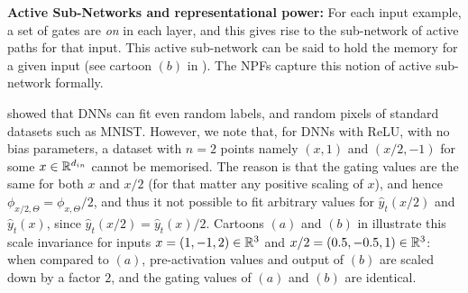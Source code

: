\textbf{Active Sub-Networks and representational power:} For each input example, a set of gates are \emph{on} in each layer, and this gives rise to the sub-network of active paths for that input. This active sub-network can be said to hold the memory for a given input (see cartoon $(b)$ in ). The NPFs capture this notion of active sub-network formally.

\cite{ben} showed that DNNs can fit even random labels, and random pixels of standard datasets such as MNIST. However, we note that, for DNNs with ReLU, with no bias parameters, a dataset with $n=2$ points namely $(x,1)$ and $(x/2,-1)$ for some $x\in \mathbb{R}^{d_{in}}$ cannot be memorised. The reason is that the gating values are the same for both $x$ and $x/2$ (for that matter any positive scaling of $x$), and hence $\phi_{x/2,\Theta}= \phi_{x,\Theta}/2$, and thus it not possible to fit arbitrary values for $\hat{y}_t(x/2)$ and $\hat{y}_t(x)$, since $\hat{y}_t(x/2)= \hat{y}_t(x)/2$. Cartoons $(a)$ and $(b)$ in  illustrate this scale invariance for inputs $x=(1,-1,2)\in\mathbb{R}^3$ and $x/2=(0.5,-0.5,1)\in\mathbb{R}^3$:  when compared to $(a)$, pre-activation values and output of $(b)$ are scaled down by a factor $2$, and the gating values of $(a)$ and $(b)$ are identical.
